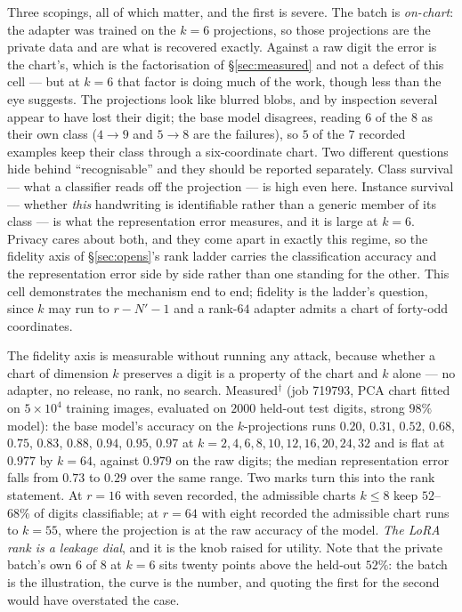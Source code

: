 Three scopings, all of which matter, and the first is severe. The batch is
\emph{on-chart}: the adapter was trained on the $k=6$ projections, so those
projections are the private data and are what is recovered exactly. Against a
raw digit the error is the chart's, which is the factorisation of
\S\ref{sec:measured} and not a defect of this cell --- but at $k=6$ that
factor is doing much of the work, though less than the eye suggests. The
projections look like blurred blobs, and by inspection several appear to have
lost their digit; the base model disagrees, reading $6$ of the $8$ as their
own class ($4\to9$ and $5\to8$ are the failures), so $5$ of the $7$ recorded
examples keep their class through a six-coordinate chart. Two different
questions hide behind ``recognisable'' and they should be reported separately.
Class survival --- what a classifier reads off the projection --- is high even
here. Instance survival --- whether \emph{this} handwriting is identifiable
rather than a generic member of its class --- is what the representation error
measures, and it is large at $k=6$. Privacy cares about both, and they come
apart in exactly this regime, so the fidelity axis of \S\ref{sec:opens}'s rank
ladder carries the classification accuracy and the representation error side
by side rather than one standing for the other. This cell demonstrates the
mechanism end to end; fidelity is the ladder's question, since $k$ may run to
$r-N'-1$ and a rank-$64$ adapter admits a chart of forty-odd coordinates.

The fidelity axis is measurable without running any attack, because whether a
chart of dimension $k$ preserves a digit is a property of the chart and $k$
alone --- no adapter, no release, no rank, no search. Measured$^\dagger$ (job
719793, PCA chart fitted on $5\times10^4$ training images, evaluated on $2000$
held-out test digits, strong $98\%$ model): the base model's accuracy on the
$k$-projections runs $0.20$, $0.31$, $0.52$, $0.68$, $0.75$, $0.83$, $0.88$,
$0.94$, $0.95$, $0.97$ at $k=2,4,6,8,10,12,16,20,24,32$ and is flat at $0.977$
by $k=64$, against $0.979$ on the raw digits; the median representation error
falls from $0.73$ to $0.29$ over the same range. Two marks turn this into the
rank statement. At $r=16$ with seven recorded, the admissible charts $k\le8$
keep $52$--$68\%$ of digits classifiable; at $r=64$ with eight recorded the
admissible chart runs to $k=55$, where the projection is at the raw accuracy
of the model. \emph{The LoRA rank is a leakage dial}, and it is the knob
raised for utility. Note that the private batch's own $6$ of $8$ at $k=6$ sits
twenty points above the held-out $52\%$: the batch is the illustration, the
curve is the number, and quoting the first for the second would have
overstated the case.

